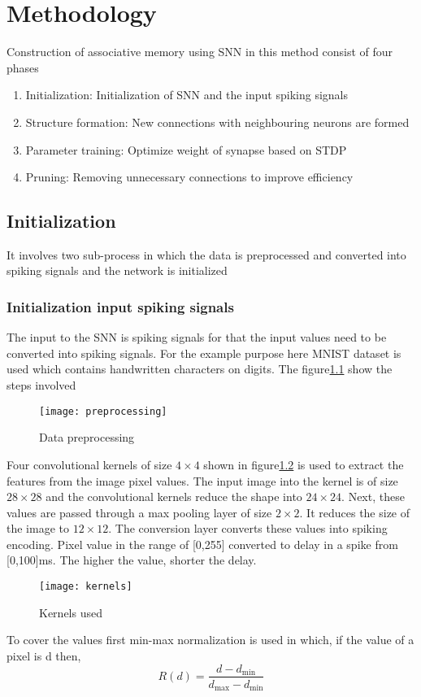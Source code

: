 \chapter{Methodology}

Construction of associative memory using SNN\cite{base} in this method consist
of four phases
\begin{enumerate}
    \itemsep0em
    \item Initialization: Initialization of SNN and the input spiking signals
    \item Structure formation: New connections with neighbouring neurons are formed
    \item Parameter training: Optimize weight of synapse based on STDP
    \item Pruning: Removing unnecessary connections to improve efficiency
\end{enumerate}
\section{Initialization}
It involves two sub-process in which the data is preprocessed and converted
into spiking signals and the network is initialized
\subsection{Initialization input spiking signals}
The input to the SNN is spiking signals for that the input values need to be
converted into spiking signals. For the example purpose here MNIST dataset is
used which contains handwritten characters on digits. The
figure\ref{preprocessing} show the steps involved

\begin{figure}[h!]
    \centering
    \texttt{[image: preprocessing]}
    \caption{Data preprocessing}\label{preprocessing}
\end{figure}

Four convolutional kernels of size $4\times4$ shown in figure\ref{kernel} is
used to extract the features from the image pixel values. The input image into
the kernel is of size $28\times28$ and the convolutional kernels reduce the
shape into $24\times24$. Next, these values are passed through a max pooling
layer of size $2\times2$. It reduces the size of the image to $12\times12$. The
conversion layer converts these values into spiking encoding. Pixel value in
the range of [0,255] converted to delay in a spike from [0,100]ms. The higher
the value, shorter the delay.
\begin{figure}[h!]
    \centering
    \texttt{[image: kernels]}
    \caption{Kernels used}\label{kernel}
\end{figure}
To cover the values first min-max normalization is used in which, if
the value of a pixel is d then,
\begin{equation*}
    R(d)=\frac{d-d_{\min}}{d_{\max}-d_{\min}}
\end{equation*}

